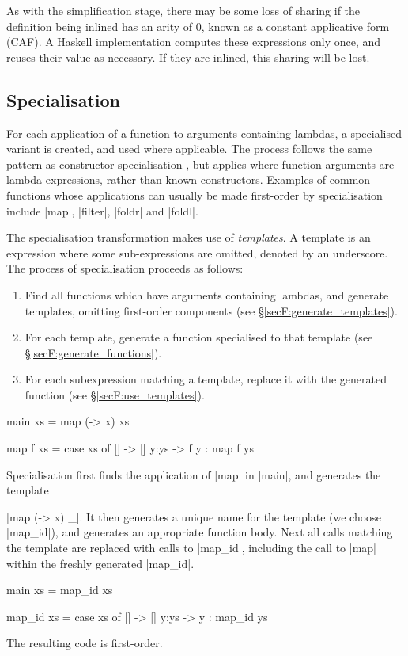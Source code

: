 As with the simplification stage, there may be some loss of sharing if the definition being inlined has an arity of 0, known as a constant applicative form (CAF). A Haskell implementation computes these expressions only once, and reuses their value as necessary. If they are inlined, this sharing will be lost.

\subsection{Specialisation}

For each application of a function to arguments containing lambdas, a specialised variant is created, and used where applicable. The process follows the same pattern as constructor specialisation \cite{spj:specconstr}, but applies where function arguments are lambda expressions, rather than known constructors. Examples of common functions whose applications can usually be made first-order by specialisation include |map|, |filter|, |foldr| and |foldl|.

The specialisation transformation makes use of \textit{templates}. A template is an expression where some sub-expressions are omitted, denoted by an underscore. The process of specialisation proceeds as follows:

\begin{enumerate}
\item Find all functions which have arguments containing lambdas, and generate templates, omitting first-order components (see \S\ref{secF:generate_templates}).
\item For each template, generate a function specialised to that template (see \S\ref{secF:generate_functions}).
\item For each subexpression matching a template, replace it with the generated function (see \S\ref{secF:use_templates}).
\end{enumerate}

\begin{example}
\label{exF:map_id}
\begin{code}
main xs = map (\x -> x) xs

map f xs = case  xs of
                 []    -> []
                 y:ys  -> f y : map f ys
\end{code}

Specialisation first finds the application of |map| in |main|, and generates the template \ignore|map (\x -> x) _|. It then generates a unique name for the template (we choose |map_id|), and generates an appropriate function body. Next all calls matching the template are replaced with calls to |map_id|, including the call to |map| within the freshly generated |map_id|.

\begin{code}
main xs = map_id xs

map_id xs = case  xs of
                  []    -> []
                  y:ys  -> y : map_id ys
\end{code}

\noindent The resulting code is first-order.
\end{example}

